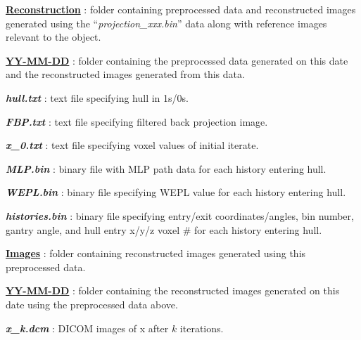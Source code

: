 \documentclass[landscape]{article}
\begin{document}
\begin{myEnumerate}[labelindent=0pt, leftmargin=*]
\begin{myEnumerate}[labelindent=1pt, leftmargin=*]
\begin{myEnumerate}[labelindent=1pt, leftmargin=*]
\begin{myEnumerate}[labelindent=1pt, leftmargin=*]
\begin{myEnumerate}[labelindent=1pt, leftmargin=*]
\begin{myEnumerate}[labelindent=1pt, leftmargin=*]
\begin{myEnumerate}[labelindent=1pt, leftmargin=*]
                            \item \ul{\textbf{Reconstruction}} : folder containing preprocessed data and reconstructed images generated using the ``\textit{projection\_xxx.bin}'' data along with reference images relevant to the object.
                            \begin{myEnumerate}[labelindent=1pt, leftmargin=*]
                                \item \ul{\textbf{YY-MM-DD}} : folder containing the preprocessed data generated on this date and the reconstructed images generated from this data.
                                \begin{myEnumerate}[labelindent=1pt, leftmargin=*]
                                    \item \textbf{\textit{hull.txt}} : text file specifying hull in 1s/0s.
                                    \item \textbf{\textit{FBP.txt}} : text file specifying filtered back projection image.
                                    \item \textbf{\textit{x\_0.txt}} : text file specifying voxel values of initial iterate.
                                    \item \textbf{\textit{MLP.bin}} : binary file with MLP path data for each history entering hull.
                                    \item \textbf{\textit{WEPL.bin}} : binary file specifying WEPL value for each history entering hull.
                                    \item \textbf{\textit{histories.bin}} : binary file specifying entry/exit coordinates/angles, bin number, gantry angle, and hull entry x/y/z voxel \# for each history entering hull.
                                    \item \ul{\textbf{Images}} : folder containing reconstructed images generated using this preprocessed data.
                                    \begin{myEnumerate}[labelindent=1pt, leftmargin=*]
                                        \item \ul{\textbf{YY-MM-DD}} : folder containing the reconstructed images generated on this date using the preprocessed data above.
                                            \begin{myEnumerate}[labelindent=1pt, leftmargin=*]
                                                \item \textbf{\textit{x\_k.dcm}} : DICOM images of x after $k$ iterations.

\end{myEnumerate}
\end{myEnumerate}
\end{myEnumerate}
\end{myEnumerate}
\end{myEnumerate}
\end{myEnumerate}
\end{myEnumerate}
\end{myEnumerate}
\end{myEnumerate}
\end{myEnumerate}
\end{myEnumerate}
\end{document}
